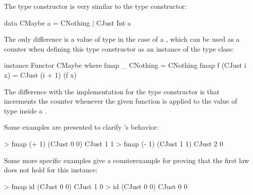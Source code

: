\begin{example}

  The  type
  constructor is very similar to the  type constructor:
  \begin{codehaskell}
data CMaybe a = CNothing | CJust Int a
  \end{codehaskell}
  The only difference is a value of type  in the case of a
  , which can be used as a counter when defining this
  type constructor as an instance of the  type class:
  \begin{codehaskell}
instance Functor CMaybe where
  fmap _ CNothing    = CNothing
  fmap f (CJust i x) = CJust (i + 1) (f x)
  \end{codehaskell}
  The difference with the implementation for the  type
  constructor is that  increments the counter 
  whenever the given function  is applied to the value of
  type  inside a .

  Some examples are presented to clarify 's behavior:
  \begin{codehaskell}
> fmap (+ 1) (CJust 0 0)
CJust 1 1
> fmap (- 1) (CJust 1 1)
CJust 2 0
  \end{codehaskell}

  Some more specific examples give a counterexample for proving that
  the first law does not hold for this instance:
  \begin{codehaskell}
> fmap id (CJust 0 0)
CJust 1 0
> id (CJust 0 0)
CJust 0 0
  \end{codehaskell}

\end{example}


